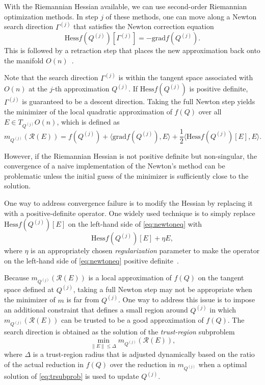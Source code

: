 \documentclass[pdflatex,sn-mathphys-num]{sn-jnl}
\begin{document}
With the Riemannian Hessian available, we can use second-order Riemannian optimization methods. In step $j$ of these methods, one can move along a Newton search direction $\Gamma^{(j)}$ that satisfies the Newton correction equation 
\begin{equation}
\textrm{Hess} f(Q^{(j)})[\Gamma^{(j)}] = -\textrm{grad} f(Q^{(j)}).
\label{eq:newtoneq}
\end{equation}
This is followed by a retraction step that places the new approximation back onto the manifold $O(n)$~\cite{boumal2023introduction}.

Note that the search direction $\Gamma^{(j)}$ is within the tangent space associated with $O(n)$ at the $j$-th approximation $Q^{(j)}$. If $\textrm{Hess} f(Q^{(j)})$ is positive definite, $\Gamma^{(j)}$ is guaranteed to be a descent direction. Taking the full Newton step yields the minimizer of the local quadratic approximation of $f(Q)$ over all $E \in T_{Q^{(j)}} O(n)$, which is defined as
\begin{equation}
m_{Q^{(j)}}(\mathcal{R}(E)) = f(Q^{(j)}) + \langle \textrm{grad}f(Q^{(j)}), E \rangle + \frac{1}{2}\langle \textrm{Hess} f(Q^{(j)})[E], E \rangle. 
\label{eq:quadmodel}
\end{equation}

However, if the Riemannian Hessian is not positive definite but non-singular, the convergence of a naive implementation of the Newton's method can be problematic unless the initial guess of the minimizer is sufficiently close to the solution.

One way to address convergence failure is to modify the Hessian by replacing it with a positive-definite operator. One widely used technique is to simply replace $\textrm{Hess} f(Q^{(j)})[E]$ on the left-hand side of \eqref{eq:newtoneq} with 
\begin{equation}
\textrm{Hess} f(Q^{(j)})[E] + \eta E,
\label{eq:regHess}
\end{equation}
where $\eta$ is an appropriately chosen \textit{regularization} parameter to make the operator on the left-hand side of \eqref{eq:newtoneq} positive definite~\cite{CGTbook00}.

Because $m_{Q^{(j)}}(\mathcal{R}(E))$ is a local approximation of $f(Q)$ on the tangent space defined at $Q^{(j)}$, taking a full Newton step may not be appropriate when the minimizer of $m$ is far from $Q^{(j)}$. One way to address this issue is to impose an additional constraint that defines a small region around $Q^{(j)}$ in which $m_{Q^{(j)}}(\mathcal{R}(E))$ can be trusted to be a good approximation of $f(Q)$. The search direction is obtained as the solution of the \textit{trust-region} subproblem
\begin{equation}
\min_{\|E\| \leq \Delta} m_{Q^{(j)}}(\mathcal{R}(E)),
\label{eq:trsubprob}
\end{equation}
where $\Delta$ is a trust-region radius that is adjusted dynamically based on the ratio of the actual reduction in $f(Q)$ over the reduction in $m_{Q^{(j)}}$ when a optimal solution of \eqref{eq:trsubprob} is used to update $Q^{(j)}$.
\end{document}
